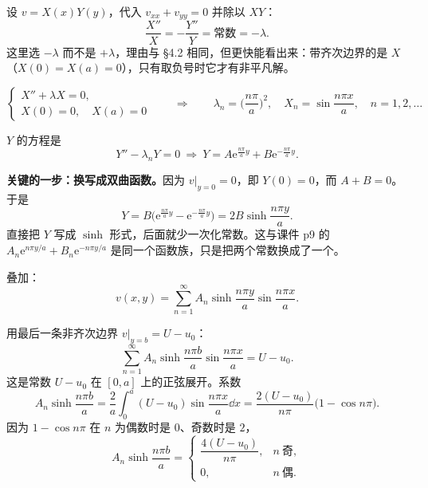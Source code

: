 \documentclass[11pt]{ctexart}
\let\origsubhdr\subhdr
\renewcommand{\subhdr}[1]{\par\needspace{3\baselineskip}\origsubhdr{#1}}
\begin{document}


设 $v=X(x)Y(y)$，代入 $v_{xx}+v_{yy}=0$ 并除以 $XY$：
\begin{equation}
  \frac{X''}{X}=-\frac{Y''}{Y}=\text{常数}=-\lambda .
\end{equation}
这里选 $-\lambda$ 而不是 $+\lambda$，理由与 \S4.2 相同，但更快能看出来：带齐次边界的是 $X$（$X(0)=X(a)=0$），只有取负号时它才有非平凡解。

\begin{equation}
  \begin{cases}
    X''+\lambda X=0,\\
    X(0)=0,\quad X(a)=0
  \end{cases}
  \qquad\Longrightarrow\qquad
  \lambda_n=\Big(\frac{n\pi}{a}\Big)^2,\quad X_n=\sin\frac{n\pi x}{a},\quad n=1,2,\dots
\end{equation}

$Y$ 的方程是
\begin{equation}
  Y''-\lambda_nY=0\ \Longrightarrow\ Y=A\mathrm e^{\frac{n\pi}{a}y}+B\mathrm e^{-\frac{n\pi}{a}y}.
\end{equation}

\textbf{关键的一步：换写成双曲函数。}因为 $v\big|_{y=0}=0$，即 $Y(0)=0$，而 $A+B=0$。于是
\begin{equation}
  Y=B\big(\mathrm e^{\frac{n\pi}{a}y}-\mathrm e^{-\frac{n\pi}{a}y}\big)=2B\sinh\frac{n\pi y}{a}.
\end{equation}
直接把 $Y$ 写成 $\sinh$ 形式，后面就少一次化常数。这与课件 p9 的 $A_n\mathrm e^{n\pi y/a}+B_n\mathrm e^{-n\pi y/a}$ 是同一个函数族，只是把两个常数换成了一个。

叠加：
\begin{equation}
  v(x,y)=\sum_{n=1}^{\infty}A_n\sinh\frac{n\pi y}{a}\sin\frac{n\pi x}{a}.
\end{equation}


用最后一条非齐次边界 $v\big|_{y=b}=U-u_0$：
\begin{equation}
  \sum_{n=1}^{\infty}A_n\sinh\frac{n\pi b}{a}\sin\frac{n\pi x}{a}=U-u_0 .
\end{equation}
这是常数 $U-u_0$ 在 $[0,a]$ 上的正弦展开。系数
\begin{equation}
  A_n\sinh\frac{n\pi b}{a}=\frac{2}{a}\int_0^a(U-u_0)\sin\frac{n\pi x}{a}\dd x
  =\frac{2(U-u_0)}{n\pi}\big(1-\cos n\pi\big).
\end{equation}
因为 $1-\cos n\pi$ 在 $n$ 为偶数时是 $0$、奇数时是 $2$，
\begin{equation}
  A_n\sinh\frac{n\pi b}{a}=
  \begin{cases}
    \dfrac{4(U-u_0)}{n\pi}, & n\ \text{奇},\\[6pt]
    0, & n\ \text{偶}.
  \end{cases}
\end{equation}
\end{document}
